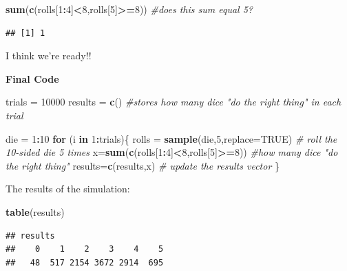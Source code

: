 \documentclass[
]{book}
\newenvironment{Shaded}{\begin{snugshade}}{\end{snugshade}}
\newcommand{\AttributeTok}[1]{\textcolor[rgb]{0.13,0.29,0.53}{#1}}
\newcommand{\CommentTok}[1]{\textcolor[rgb]{0.56,0.35,0.01}{\textit{#1}}}
\newcommand{\ConstantTok}[1]{\textcolor[rgb]{0.56,0.35,0.01}{#1}}
\newcommand{\ControlFlowTok}[1]{\textcolor[rgb]{0.13,0.29,0.53}{\textbf{#1}}}
\newcommand{\DecValTok}[1]{\textcolor[rgb]{0.00,0.00,0.81}{#1}}
\newcommand{\FunctionTok}[1]{\textcolor[rgb]{0.13,0.29,0.53}{\textbf{#1}}}
\newcommand{\NormalTok}[1]{#1}
\newcommand{\OtherTok}[1]{\textcolor[rgb]{0.56,0.35,0.01}{#1}}
\newcommand{\SpecialCharTok}[1]{\textcolor[rgb]{0.81,0.36,0.00}{\textbf{#1}}}
\theoremstyle{definition}
\theoremstyle{definition}
\theoremstyle{definition}
\theoremstyle{definition}
\theoremstyle{remark}
\begin{document}
\begin{Shaded}
\begin{Highlighting}[]
\FunctionTok{sum}\NormalTok{(}\FunctionTok{c}\NormalTok{(rolls[}\DecValTok{1}\SpecialCharTok{:}\DecValTok{4}\NormalTok{]}\SpecialCharTok{\textless{}}\DecValTok{8}\NormalTok{,rolls[}\DecValTok{5}\NormalTok{]}\SpecialCharTok{\textgreater{}=}\DecValTok{8}\NormalTok{)) }\CommentTok{\#does this sum equal 5?}
\end{Highlighting}
\end{Shaded}

\begin{verbatim}
## [1] 1
\end{verbatim}

I think we're ready!!

\textbf{Final Code}

\begin{Shaded}
\begin{Highlighting}[]
\NormalTok{trials }\OtherTok{=} \DecValTok{10000}
\NormalTok{results }\OtherTok{=} \FunctionTok{c}\NormalTok{() }\CommentTok{\#stores how many dice "do the right thing" in each trial}

\NormalTok{die }\OtherTok{=} \DecValTok{1}\SpecialCharTok{:}\DecValTok{10}
\ControlFlowTok{for}\NormalTok{ (i }\ControlFlowTok{in} \DecValTok{1}\SpecialCharTok{:}\NormalTok{trials)\{}
\NormalTok{  rolls }\OtherTok{=} \FunctionTok{sample}\NormalTok{(die,}\DecValTok{5}\NormalTok{,}\AttributeTok{replace=}\ConstantTok{TRUE}\NormalTok{) }\CommentTok{\# roll the 10{-}sided die 5 times}
\NormalTok{  x}\OtherTok{=}\FunctionTok{sum}\NormalTok{(}\FunctionTok{c}\NormalTok{(rolls[}\DecValTok{1}\SpecialCharTok{:}\DecValTok{4}\NormalTok{]}\SpecialCharTok{\textless{}}\DecValTok{8}\NormalTok{,rolls[}\DecValTok{5}\NormalTok{]}\SpecialCharTok{\textgreater{}=}\DecValTok{8}\NormalTok{)) }\CommentTok{\#how many dice "do the right thing"}
\NormalTok{  results}\OtherTok{=}\FunctionTok{c}\NormalTok{(results,x) }\CommentTok{\# update the results vector}
\NormalTok{\}}
\end{Highlighting}
\end{Shaded}

The results of the simulation:

\begin{Shaded}
\begin{Highlighting}[]
\FunctionTok{table}\NormalTok{(results)}
\end{Highlighting}
\end{Shaded}

\begin{verbatim}
## results
##    0    1    2    3    4    5 
##   48  517 2154 3672 2914  695
\end{verbatim}
\end{document}
